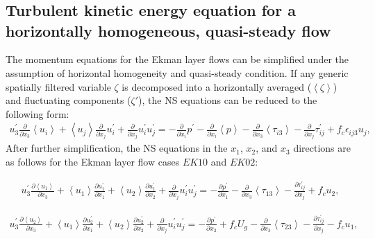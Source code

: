 \chapter{}
\vspace{-50pt}
\section{Turbulent kinetic energy equation for a horizontally homogeneous, quasi-steady flow}
\label{app:A_tke}

The momentum equations for the Ekman layer flows can be simplified under the assumption of horizontal homogeneity and quasi-steady condition. If any generic spatially filtered variable $\zeta$ is decomposed into a horizontally  averaged ($\left< \zeta \right>$) and fluctuating components ($\zeta\prime$), the NS equations can be reduced  to the following form:         
\begin{align}
    u^{\prime}_3\frac{\partial }{\partial x_3}\left < u_i \right > + \left < u_j \right > \frac{\partial}{\partial x_j} u_i^{\prime} + \frac{\partial }{\partial x_j} u_i^{\prime}u_j^{\prime} = -\frac{\partial }{\partial x_i} p^{\prime} - \frac{\partial }{\partial x_i} \left < p \right > - \frac{\partial }{\partial x_3} \left < \tau_{i3}\right > - \frac{\partial }{\partial x_j} \tau_{ij}^{\prime}+f_c\epsilon_{ij3}u_j,
\end{align}
\noindent After further simplification, the NS equations in the $x_1$, $x_2$, and $x_3$ directions are as follows for the Ekman layer flow cases $EK10$ and $EK02$:

\begin{align}
   u^{\prime}_3\frac{\partial \left < u_1 \right >}{\partial x_3} + \left < u_1 \right > \frac{\partial u_1^{\prime}}{\partial x_1} + \left < u_2 \right > \frac{\partial u_1^{\prime} }{\partial x_2} + \frac{\partial }{\partial x_j} u_i^{\prime}u_j^{\prime} = -\frac{\partial p^{\prime}}{\partial x_1}  - \frac{\partial }{\partial x_3} \left < \tau_{13}\right > - \frac{\partial \tau_{ij}^{\prime}}{\partial x_j} +f_cu_2,
\end{align}

\begin{align}
   u^{\prime}_3\frac{\partial \left < u_2 \right > }{\partial x_3}+ \left < u_1 \right > \frac{\partial u_2^{\prime}}{\partial x_1}  + \left < u_2 \right > \frac{\partial u_2^{\prime} }{\partial x_2} + \frac{\partial }{\partial x_j} u_i^{\prime}u_j^{\prime} = -\frac{\partial p^{\prime} }{\partial x_2} + f_c U_g - \frac{\partial }{\partial x_3} \left < \tau_{23}\right > - \frac{\partial \tau_{ij}^{\prime}}{\partial x_j} -f_cu_1,
\end{align}

